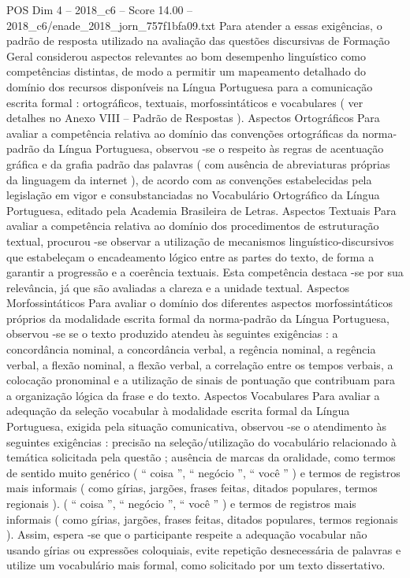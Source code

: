 \begin{textsample}{POS Dim 4 – 2018\_c6 – Score 14.00 – 2018\_c6/enade\_2018\_jorn\_757f1bfa09.txt}
Para atender a essas exigências, o padrão de resposta utilizado na avaliação das questões discursivas de Formação Geral considerou aspectos relevantes ao bom desempenho linguístico como competências distintas, de modo a permitir um mapeamento detalhado do domínio dos recursos disponíveis na Língua Portuguesa para a comunicação escrita formal : ortográficos, textuais, morfossintáticos e vocabulares ( ver detalhes no Anexo VIII – Padrão de Respostas ).
Aspectos Ortográficos Para avaliar a competência relativa ao domínio das convenções ortográficas da norma-padrão da Língua Portuguesa, observou -se o respeito às regras de acentuação gráfica e da grafia padrão das palavras ( com ausência de abreviaturas próprias da linguagem da internet ), de acordo com as convenções estabelecidas pela legislação em vigor e consubstanciadas no Vocabulário Ortográfico da Língua Portuguesa, editado pela Academia Brasileira de Letras.
Aspectos Textuais Para avaliar a competência relativa ao domínio dos procedimentos de estruturação textual, procurou -se observar a utilização de mecanismos linguístico-discursivos que estabeleçam o encadeamento lógico entre as partes do texto, de forma a garantir a progressão e a coerência textuais.
Esta competência destaca -se por sua relevância, já que são avaliadas a clareza e a unidade textual.
Aspectos Morfossintáticos Para avaliar o domínio dos diferentes aspectos morfossintáticos próprios da modalidade escrita formal da norma-padrão da Língua Portuguesa, observou -se se o texto produzido atendeu às seguintes exigências : a concordância nominal, a concordância verbal, a regência nominal, a regência verbal, a flexão nominal, a flexão verbal, a correlação entre os tempos verbais, a colocação pronominal e a utilização de sinais de pontuação que contribuam para a organização lógica da frase e do texto.
Aspectos Vocabulares Para avaliar a adequação da seleção vocabular à modalidade escrita formal da Língua Portuguesa, exigida pela situação comunicativa, observou -se o atendimento às seguintes exigências : precisão na seleção/utilização do vocabulário relacionado à temática solicitada pela questão ; ausência de marcas da oralidade, como termos de sentido muito genérico ( “ coisa ”, “ negócio ”, “ você ” ) e termos de registros mais informais ( como gírias, jargões, frases feitas, ditados populares, termos regionais ). ( “ coisa ”, “ negócio ”, “ você ” ) e termos de registros mais informais ( como gírias, jargões, frases feitas, ditados populares, termos regionais ).
Assim, espera -se que o participante respeite a adequação vocabular não usando gírias ou expressões coloquiais, evite repetição desnecessária de palavras e utilize um vocabulário mais formal, como solicitado por um texto dissertativo.

\end{textsample}
